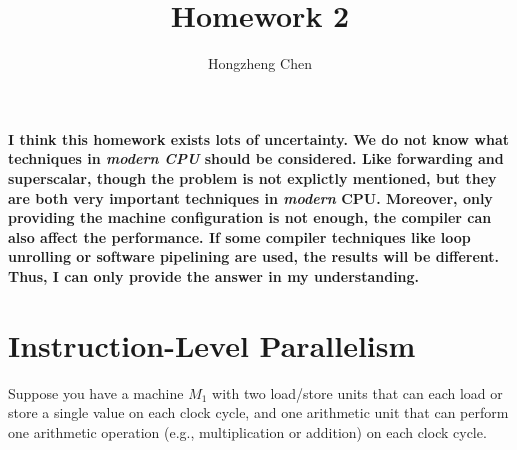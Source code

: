 \documentclass[english]{thesis}
\title{Homework 2}
\author{Hongzheng Chen}
\begin{document}
\maketitle

\textbf{I think this homework exists lots of uncertainty.
We do not know what techniques in \emph{modern CPU} should be considered.
Like forwarding and superscalar, though the problem is not explictly mentioned, but they are both very important techniques in \emph{modern} CPU.
Moreover, only providing the machine configuration is not enough, the compiler can also affect the performance.
If some compiler techniques like loop unrolling or software pipelining are used, the results will be different.
Thus, I can only provide the answer in my understanding.}

\section{Instruction-Level Parallelism}
Suppose you have a machine $M_1$ with two load/store units that can each load or store a single value on each clock cycle, and one arithmetic unit that can perform one arithmetic operation (e.g., multiplication or addition) on each clock cycle.
\end{document}
